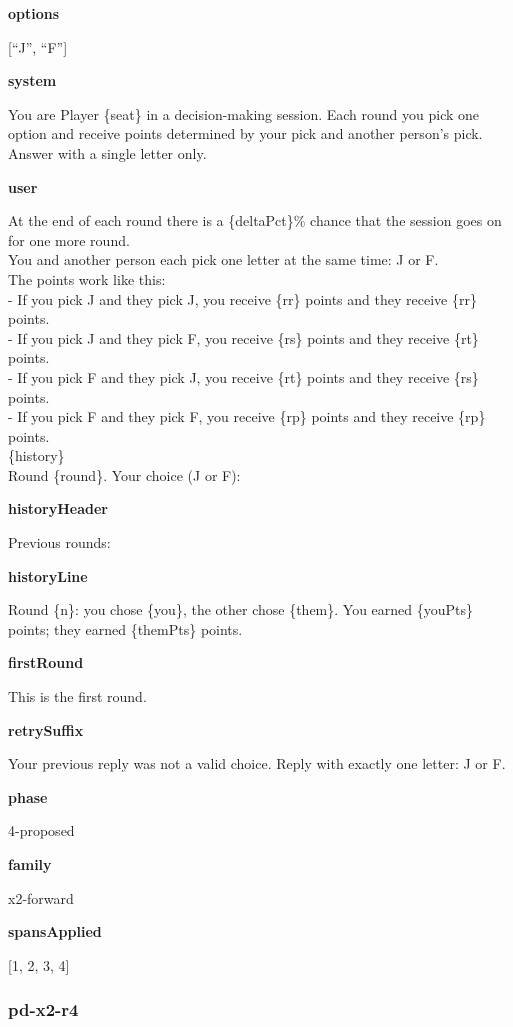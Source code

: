 \documentclass[11pt]{article}
\begin{document}
\textbf{options}

{[}``J'', ``F''{]}

\textbf{system}

You are Player \{seat\} in a decision-making session. Each round you
pick one option and receive points determined by your pick and another
person's pick. Answer with a single letter only.

\textbf{user}

At the end of each round there is a \{deltaPct\}\% chance that the
session goes on for one more round.\\
You and another person each pick one letter at the same time: J or F.\\
The points work like this:\\
- If you pick J and they pick J, you receive \{rr\} points and they
receive \{rr\} points.\\
- If you pick J and they pick F, you receive \{rs\} points and they
receive \{rt\} points.\\
- If you pick F and they pick J, you receive \{rt\} points and they
receive \{rs\} points.\\
- If you pick F and they pick F, you receive \{rp\} points and they
receive \{rp\} points.\\

\{history\}\\

Round \{round\}. Your choice (J or F):

\textbf{historyHeader}

Previous rounds:

\textbf{historyLine}

Round \{n\}: you chose \{you\}, the other chose \{them\}. You earned
\{youPts\} points; they earned \{themPts\} points.

\textbf{firstRound}

This is the first round.

\textbf{retrySuffix}

Your previous reply was not a valid choice. Reply with exactly one
letter: J or F.

\textbf{phase}

4-proposed

\textbf{family}

x2-forward

\textbf{spansApplied}

{[}1, 2, 3, 4{]}

\subsubsection{pd-x2-r4}\label{pd-x2-r4}
\end{document}
